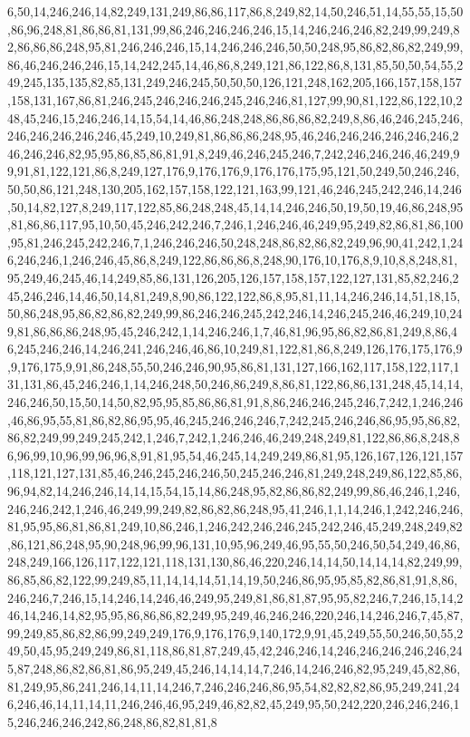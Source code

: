 6,50,14,246,246,14,82,249,131,249,86,86,117,86,8,249,82,14,50,246,51,14,55,55,15,50,86,96,248,81,86,86,81,131,99,86,246,246,246,246,15,14,246,246,246,82,249,99,249,82,86,86,86,248,95,81,246,246,246,15,14,246,246,246,50,50,248,95,86,82,86,82,249,99,86,46,246,246,246,15,14,242,245,14,46,86,8,249,121,86,122,86,8,131,85,50,50,54,55,249,245,135,135,82,85,131,249,246,245,50,50,50,126,121,248,162,205,166,157,158,157,158,131,167,86,81,246,245,246,246,246,245,246,246,81,127,99,90,81,122,86,122,10,248,45,246,15,246,246,14,15,54,14,46,86,248,248,86,86,86,82,249,8,86,46,246,245,246,246,246,246,246,246,45,249,10,249,81,86,86,86,248,95,46,246,246,246,246,246,246,246,246,246,82,95,95,86,85,86,81,91,8,249,46,246,245,246,7,242,246,246,246,46,249,99,91,81,122,121,86,8,249,127,176,9,176,176,9,176,176,175,95,121,50,249,50,246,246,50,50,86,121,248,130,205,162,157,158,122,121,163,99,121,46,246,245,242,246,14,246,50,14,82,127,8,249,117,122,85,86,248,248,45,14,14,246,246,50,19,50,19,46,86,248,95,81,86,86,117,95,10,50,45,246,242,246,7,246,1,246,246,46,249,95,249,82,86,81,86,100,95,81,246,245,242,246,7,1,246,246,246,50,248,248,86,82,86,82,249,96,90,41,242,1,246,246,246,1,246,246,45,86,8,249,122,86,86,86,8,248,90,176,10,176,8,9,10,8,8,248,81,95,249,46,245,46,14,249,85,86,131,126,205,126,157,158,157,122,127,131,85,82,246,245,246,246,14,46,50,14,81,249,8,90,86,122,122,86,8,95,81,11,14,246,246,14,51,18,15,50,86,248,95,86,82,86,82,249,99,86,246,246,245,242,246,14,246,245,246,46,249,10,249,81,86,86,86,248,95,45,246,242,1,14,246,246,1,7,46,81,96,95,86,82,86,81,249,8,86,46,245,246,246,14,246,241,246,246,46,86,10,249,81,122,81,86,8,249,126,176,175,176,9,9,176,175,9,91,86,248,55,50,246,246,90,95,86,81,131,127,166,162,117,158,122,117,131,131,86,45,246,246,1,14,246,248,50,246,86,249,8,86,81,122,86,86,131,248,45,14,14,246,246,50,15,50,14,50,82,95,95,85,86,86,81,91,8,86,246,246,245,246,7,242,1,246,246,46,86,95,55,81,86,82,86,95,95,46,245,246,246,246,7,242,245,246,246,86,95,95,86,82,86,82,249,99,249,245,242,1,246,7,242,1,246,246,46,249,248,249,81,122,86,86,8,248,86,96,99,10,96,99,96,96,8,91,81,95,54,46,245,14,249,249,86,81,95,126,167,126,121,157,118,121,127,131,85,46,246,245,246,246,50,245,246,246,81,249,248,249,86,122,85,86,96,94,82,14,246,246,14,14,15,54,15,14,86,248,95,82,86,86,82,249,99,86,46,246,1,246,246,246,242,1,246,46,249,99,249,82,86,82,86,248,95,41,246,1,1,14,246,1,242,246,246,81,95,95,86,81,86,81,249,10,86,246,1,246,242,246,246,245,242,246,45,249,248,249,82,86,121,86,248,95,90,248,96,99,96,131,10,95,96,249,46,95,55,50,246,50,54,249,46,86,248,249,166,126,117,122,121,118,131,130,86,46,220,246,14,14,50,14,14,14,82,249,99,86,85,86,82,122,99,249,85,11,14,14,14,51,14,19,50,246,86,95,95,85,82,86,81,91,8,86,246,246,7,246,15,14,246,14,246,46,249,95,249,81,86,81,87,95,95,82,246,7,246,15,14,246,14,246,14,82,95,95,86,86,86,82,249,95,249,46,246,246,220,246,14,246,246,7,45,87,99,249,85,86,82,86,99,249,249,176,9,176,176,9,140,172,9,91,45,249,55,50,246,50,55,249,50,45,95,249,249,86,81,118,86,81,87,249,45,42,246,246,14,246,246,246,246,246,245,87,248,86,82,86,81,86,95,249,45,246,14,14,14,7,246,14,246,246,82,95,249,45,82,86,81,249,95,86,241,246,14,11,14,246,7,246,246,246,86,95,54,82,82,82,86,95,249,241,246,246,46,14,11,14,11,246,246,46,95,249,46,82,82,45,249,95,50,242,220,246,246,246,15,246,246,246,242,86,248,86,82,81,81,8